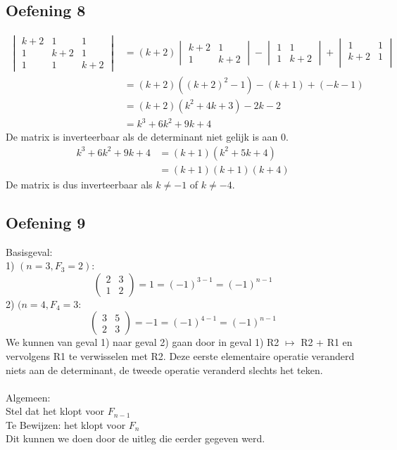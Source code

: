 \documentclass[lineaire_algebra_oplossingen.tex]{subfiles}
\begin{document}
\subsection{Oefening 8}
\begin{align*}
    \begin{vmatrix}
        k+2 & 1 & 1\\
        1 & k+2 & 1\\
        1 & 1 & k+2
    \end{vmatrix}
    &= (k+2) 
    \begin{vmatrix}
        k+2 & 1\\
        1 & k+2    
    \end{vmatrix} - 
    \begin{vmatrix}
        1 & 1\\
        1 & k+2
    \end{vmatrix} + 
    \begin{vmatrix}
        1 & 1\\
        k+2 & 1\\
    \end{vmatrix}\\
    &= (k+2)((k+2)^2 - 1) - (k+1) + (-k-1)\\
    &= (k+2)(k^2 + 4k + 3) -2k - 2\\
    &= k^3 + 6k^2 + 9k + 4
\end{align*}
De matrix is inverteerbaar als de determinant niet gelijk is aan 0.
\begin{align*}
    k^3 + 6k^2 + 9k + 4 &= (k+1)(k^2 + 5k + 4)\\
    &= (k+1)(k+1)(k+4)
\end{align*}
De matrix is dus inverteerbaar als $k \neq -1$ of $k \neq -4$.

\subsection{Oefening 9}
Basisgeval: \\
1) $(n=3, F_{3}=2):$
\[ 
\begin{pmatrix}
2 & 3\\ 
1 & 2
\end{pmatrix}
= 1 = (-1)^{3-1} = (-1)^{n-1}
\]
2) $(n=4, F_{4}=3:$
\[
\begin{pmatrix}
3 & 5\\ 
2 & 3
\end{pmatrix}
= -1 = (-1)^{4-1} = (-1)^{n-1}
\]
We kunnen van geval 1) naar geval 2) gaan door in geval 1) R2 $\longmapsto $ R2 + R1 en vervolgens R1 te verwisselen met R2. Deze eerste elementaire operatie veranderd niets aan de determinant, de tweede operatie veranderd slechts het teken. \\
\\
Algemeen:\\
Stel dat het klopt voor $F_{n-1}$\\
Te Bewijzen: het klopt voor $F_{n}$\\
Dit kunnen we doen door de uitleg die eerder gegeven werd.
\end{document}
